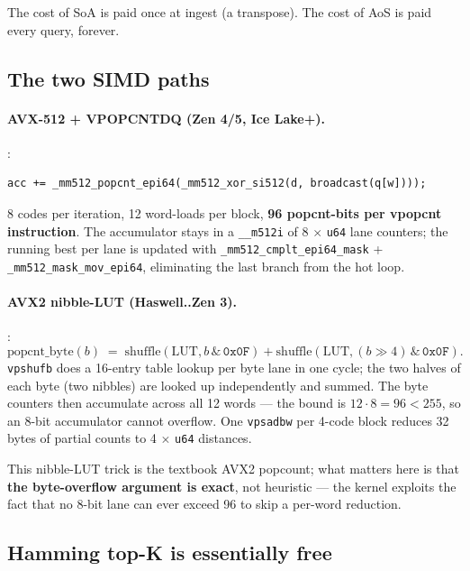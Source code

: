 \documentclass[11pt,a4paper]{article}
\begin{document}
The cost of SoA is paid once at ingest (a transpose). The cost of AoS
is paid every query, forever.

\subsection{The two SIMD paths}

\paragraph{AVX-512 + VPOPCNTDQ (Zen 4/5, Ice Lake+).}
:
\begin{lstlisting}[style=cstyle]
acc += _mm512_popcnt_epi64(_mm512_xor_si512(d, broadcast(q[w])));
\end{lstlisting}
8 codes per iteration, 12 word-loads per block, \textbf{96 popcnt-bits
per vpopcnt instruction}. The accumulator stays in a \texttt{\_\_m512i}
of 8 $\times$ \texttt{u64} lane counters; the running best per lane is
updated with \texttt{\_mm512\_cmplt\_epi64\_mask} +
\texttt{\_mm512\_mask\_mov\_epi64}, eliminating the last branch from
the hot loop.

\paragraph{AVX2 nibble-LUT (Haswell..Zen 3).}
:
\begin{equation}
\mathrm{popcnt\_byte}(b) \;=\; \mathrm{shuffle}(\mathrm{LUT}, b \,\&\, \mathtt{0x0F}) + \mathrm{shuffle}(\mathrm{LUT}, (b \gg 4) \,\&\, \mathtt{0x0F}).
\end{equation}
\texttt{vpshufb} does a 16-entry table lookup per byte lane in one
cycle; the two halves of each byte (two nibbles) are looked up
independently and summed. The byte counters then accumulate across all
12 words --- the bound is $12 \cdot 8 = 96 < 255$, so an 8-bit
accumulator cannot overflow. One \texttt{vpsadbw} per 4-code block
reduces 32 bytes of partial counts to 4 $\times$ \texttt{u64}
distances.

This nibble-LUT trick is the textbook AVX2 popcount; what matters here
is that \textbf{the byte-overflow argument is exact}, not heuristic ---
the kernel exploits the fact that no 8-bit lane can ever exceed 96 to
skip a per-word reduction.

\subsection{Hamming top-K is essentially free}
\label{sec:topk-free}
\end{document}
